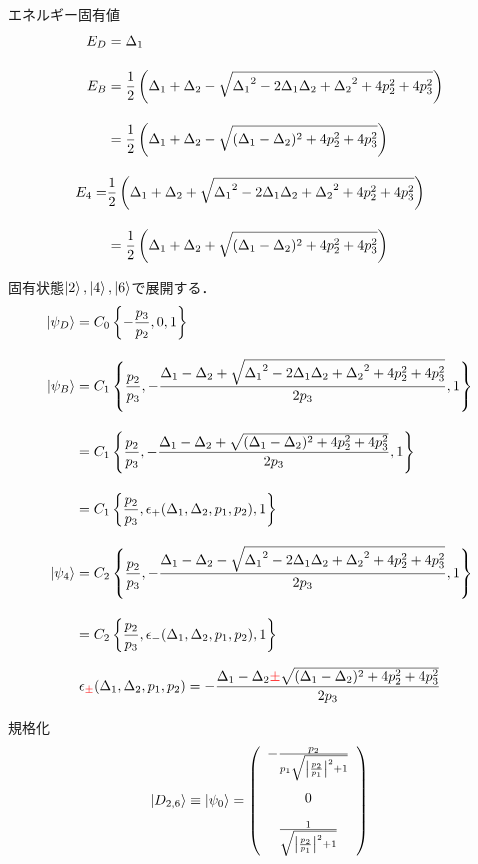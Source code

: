 エネルギー固有値
\begin{align}
    E_D&=
    {\Delta_{1}}\\[10pt]
    E_B&=
    \frac{1}{2}\left({\Delta_{1}}+{\Delta_{2}}-\sqrt{{\Delta_{1}}^2-2{\Delta_{1}}{\Delta_{2}}+{\Delta_{2}}^2+4p_2^2+4p_3^2}\right)\nn[10pt]
    &=\frac{1}{2}\left({\Delta_{1}}+{\Delta_{2}}-\sqrt{{
    (\Delta_{1}}-{\Delta_{2}})^2+4p_2^2+4p_3^2}\right)\\[10pt]
    E_4=&\frac{1}{2}\left({\Delta_{1}}+{\Delta_{2}}+\sqrt{{\Delta_{1}}^2-2{\Delta_{1}}{\Delta_{2}}+{\Delta_{2}}^2+4p_2^2+4p_3^2}\right)
    \nn[10pt]
    &=\frac{1}{2}\left({\Delta_{1}}+{\Delta_{2}}
    +\sqrt{{
    (\Delta_{1}}-{\Delta_{2}})^2+4p_2^2+4p_3^2}\right)
    \end{align}


固有状態$\ket{2}, \ket{4}, \ket{6}$で展開する．
\begin{align}
    \ket{\psi_D}&=C_0\left\{-\frac{{p_{3}}}{{p_{2}}},0,1\right\}\\[10pt]
    \ket{\psi_B}&=C_1\left\{\frac{{p_{2}}}{{p_{3}}},-\frac{{\Delta_{1}}-{\Delta_{2}}+\sqrt{{\Delta_{1}}^2-2{\Delta_{1}}{\Delta_{2}}+{\Delta_{2}}^2+4p_2^2+4p_3^2}}{2{p_{3}}},1\right\}\nn[10pt]
    &=C_1\left\{\frac{{p_{2}}}{{p_{3}}},-\frac{{\Delta_{1}}-{\Delta_{2}}
    +\sqrt{({\Delta_{1}}-{\Delta_{2}})^2+4p_2^2+4p_3^2}}{2{p_{3}}},1\right\}\nn[10pt]
    &=C_1\left\{\frac{{p_{2}}}{{p_{3}}},
    \epsilon_+({\Delta_{1}},{\Delta_{2}},
    p_1,p_2)
    ,1\right\}\\[10pt]
    \ket{\psi_4}&=C_2\left\{\frac{{p_{2}}}{{p_{3}}},-\frac{{\Delta_{1}}-{\Delta_{2}}-\sqrt{{\Delta_{1}}^2-2{\Delta_{1}}{\Delta_{2}}+{\Delta_{2}}^2+4p_2^2+4p_3^2}}{2{p_{3}}},1\right\}\nn[10pt]
    &=C_2\left\{\frac{{p_{2}}}{{p_{3}}},
    \epsilon_-({\Delta_{1}},{\Delta_{2}},
    p_1,p_2)
    ,1\right\}
\end{align}

\begin{align}
    \epsilon_{\textcolor{red}{\pm}}({\Delta_{1}},{\Delta_{2}},
    p_1,p_2)
    =-\frac{{\Delta_{1}}-{\Delta_{2}}
    \textcolor{red}{\pm}\sqrt{({\Delta_{1}}-{\Delta_{2}})^2+4p_2^2+4p_3^2}}{2{p_{3}}}
\end{align}


規格化
\begin{equation}
        \ket{D_{2,6}}\equiv\ket{\psi_0}=\left(
        \begin{array}{c}
       -\frac{{p_2}}{{p_1}\sqrt{\left|\frac{{p_2}}{{p_1}}\right|^2+1}}\\[20pt]
       0\\[10pt]
       \frac{1}{\sqrt{\left|\frac{{p_2}}{{p_1}}\right|^2+1}}\\[10pt]
        \end{array}
        \right)
\end{equation}

